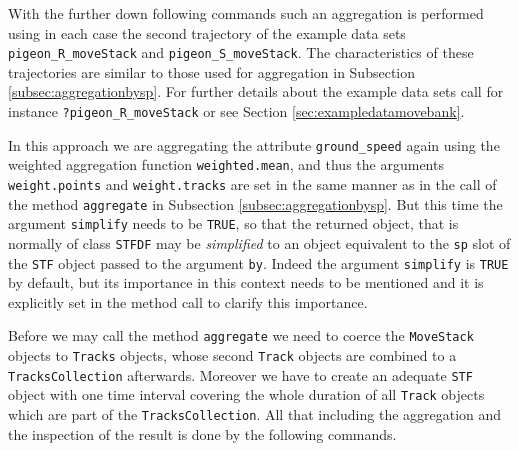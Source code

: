 \documentclass[12pt, oneside, a4paper]{scrbook}
\let\code=\texttt
\begin{document}
With the further down following commands such an aggregation is performed using in each case the second trajectory of the example data sets \code{pigeon\_R\_moveStack} and \code{pigeon\_S\_moveStack}. The characteristics of these trajectories are similar to those used for aggregation in Subsection \ref{subsec:aggregationbysp}. For further details about the example data sets call for instance \code{?pigeon\_R\_moveStack} or see Section \ref{sec:exampledatamovebank}. 
\par\medskip

In this approach we are aggregating the attribute \code{ground\_speed} again using the weighted aggregation function \code{weighted.mean}, and thus the arguments \code{weight.points} and \code{weight.tracks} are set in the same manner as in the call of the method \code{aggregate} in Subsection \ref{subsec:aggregationbysp}.
But this time the argument \code{simplify} needs to be \code{TRUE}, so that the returned object, that is normally of class \code{STFDF} may be \textit{simplified} to an object equivalent to the \code{sp} slot of the \code{STF} object passed to the argument \code{by}. Indeed the argument \code{simplify} is \code{TRUE} by default, but its importance in this context needs to be mentioned and it is explicitly set in the method call to clarify this importance.
\par\medskip

Before we may call the method \code{aggregate} we need to coerce the \code{MoveStack} objects to \code{Tracks} objects, whose second \code{Track} objects are combined to a \code{TracksCollection} afterwards. Moreover we have to create an adequate \code{STF} object with one time interval covering the whole duration of all \code{Track} objects which are part of the \code{TracksCollection}. All that including the aggregation and the inspection of the result is done by the following commands.
\end{document}
